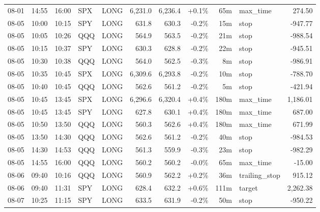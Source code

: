 \documentclass[11pt,a4paper,twoside]{article}
\begin{document}
\begin{center}
\begin{longtable}{>{\color{txtmain}}l l l l l r r r r >{\color{txtmain}}l r}
08-01 & 14:55 & 16:00 & SPX & LONG & 6,231.0 & 6,236.4 & \textcolor{wingreen}{+0.1\%} & 65m & max\_time & \textcolor{wingreen}{274.50} \\
08-05 & 10:00 & 10:15 & SPY & LONG & 631.8 & 630.3 & \textcolor{lossred}{-0.2\%} & 15m & stop & \textcolor{lossred}{-947.77} \\
08-05 & 10:05 & 10:26 & QQQ & LONG & 564.9 & 563.5 & \textcolor{lossred}{-0.2\%} & 21m & stop & \textcolor{lossred}{-988.54} \\
08-05 & 10:15 & 10:37 & SPY & LONG & 630.3 & 628.8 & \textcolor{lossred}{-0.2\%} & 22m & stop & \textcolor{lossred}{-945.51} \\
08-05 & 10:30 & 10:38 & QQQ & LONG & 564.0 & 562.5 & \textcolor{lossred}{-0.3\%} & 8m & stop & \textcolor{lossred}{-986.91} \\
08-05 & 10:35 & 10:45 & SPX & LONG & 6,309.6 & 6,293.8 & \textcolor{lossred}{-0.2\%} & 10m & stop & \textcolor{lossred}{-788.70} \\
08-05 & 10:40 & 10:45 & QQQ & LONG & 562.6 & 561.2 & \textcolor{lossred}{-0.2\%} & 5m & stop & \textcolor{lossred}{-421.94} \\
08-05 & 10:45 & 13:45 & SPX & LONG & 6,296.6 & 6,320.4 & \textcolor{wingreen}{+0.4\%} & 180m & max\_time & \textcolor{wingreen}{1,186.01} \\
08-05 & 10:45 & 13:45 & SPY & LONG & 627.8 & 630.1 & \textcolor{wingreen}{+0.4\%} & 180m & max\_time & \textcolor{wingreen}{687.00} \\
08-05 & 10:50 & 13:50 & QQQ & LONG & 560.3 & 562.6 & \textcolor{wingreen}{+0.4\%} & 180m & max\_time & \textcolor{wingreen}{671.99} \\
08-05 & 13:50 & 14:30 & QQQ & LONG & 562.6 & 561.2 & \textcolor{lossred}{-0.2\%} & 40m & stop & \textcolor{lossred}{-984.53} \\
08-05 & 14:30 & 14:53 & QQQ & LONG & 561.3 & 559.9 & \textcolor{lossred}{-0.3\%} & 23m & stop & \textcolor{lossred}{-982.29} \\
08-05 & 14:55 & 16:00 & QQQ & LONG & 560.2 & 560.2 & \textcolor{lossred}{-0.0\%} & 65m & max\_time & \textcolor{lossred}{-15.00} \\
08-06 & 09:40 & 10:16 & QQQ & LONG & 560.9 & 562.2 & \textcolor{wingreen}{+0.2\%} & 36m & trailing\_stop & \textcolor{wingreen}{915.12} \\
08-06 & 09:40 & 11:31 & SPY & LONG & 628.4 & 632.2 & \textcolor{wingreen}{+0.6\%} & 111m & target & \textcolor{wingreen}{2,262.38} \\
08-07 & 10:25 & 11:15 & SPY & LONG & 633.5 & 631.9 & \textcolor{lossred}{-0.2\%} & 50m & stop & \textcolor{lossred}{-950.22} \\

\end{longtable}
\end{center}
\end{document}
